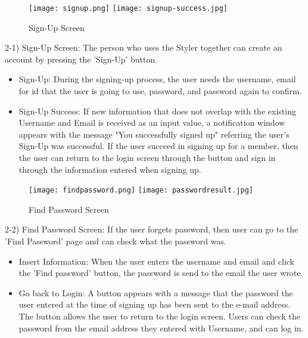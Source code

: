 \documentclass[conference]{IEEEtran}
\begin{document}
\begin{figure}[htbp]
\centerline{
\texttt{[image: signup.png]}
\texttt{[image: signup-success.jpg]}
}
\caption{Sign-Up Screen}
\label{fig}
\end{figure}
2-1) Sign-Up Screen: The person who uses the Styler together can create an account by pressing the 'Sign-Up' button.
\begin{itemize}
    \item Sign-Up: During the signing-up process, the user needs the username, email for id that the user is going to use, password, and password again to confirm.
    \item Sign-Up Success: If new information that does not overlap with the existing Username and Email is received as an input value, a notification window appears with the message "You successfully signed up" referring the user's Sign-Up was successful. If the user succeed in signing up for a member, then the user can return to the login screen through the button and sign in through the information entered when signing up.\\
\end{itemize}

\begin{figure}[htbp]
\centerline{
\texttt{[image: findpassword.png]}
\texttt{[image: passwordresult.jpg]}
}
\caption{Find Password Screen}
\label{fig}
\end{figure}
2-2) Find Password Screen: If the user forgets password, then user can go to the 'Find Password' page and can check what the password was. 
\begin{itemize}
    \item Insert Information: When the user enters the username and email and click the 'Find password' button, the password is send to the email the user wrote.
    \item Go back to Login: A button appears with a message that the password the user entered at the time of signing up has been sent to the e-mail address. The button allows the user to return to the login screen. Users can check the password from the email address they entered with Username, and can log in.\\
\end{itemize}
\end{document}
